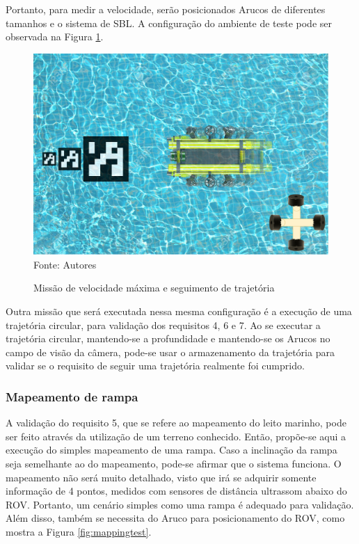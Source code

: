 Portanto, para medir a velocidade, serão posicionados Arucos de diferentes tamanhos e o sistema de SBL. A configuração do ambiente de teste pode ser observada na Figura \ref{fig:speedtest}. 

\begin{figure}[h]
	\centering
	\caption{Missão de velocidade máxima e seguimento de trajetória}
	\label{fig:speedtest}
	\includegraphics[width=0.8\linewidth]{images/speed_test}\\
	\footnotesize Fonte: Autores
\end{figure}

Outra missão que será executada nessa mesma configuração é a execução de uma trajetória circular, para validação dos requisitos 4, 6 e 7. Ao se executar a trajetória circular, mantendo-se a profundidade e mantendo-se os Arucos no campo de visão da câmera, pode-se usar o armazenamento da trajetória para validar se o requisito de seguir uma trajetória realmente foi cumprido.

\subsubsection*{Mapeamento de rampa}

A validação do requisito 5, que se refere ao mapeamento do leito marinho, pode ser
feito através da utilização de um terreno conhecido. Então, propõe-se aqui a execução do simples mapeamento de uma rampa. Caso a inclinação da rampa seja semelhante ao do mapeamento, pode-se afirmar que o sistema funciona. O mapeamento não será muito detalhado, visto que irá se adquirir somente informação de 4 pontos, medidos com sensores de distância ultrassom abaixo do ROV. Portanto, um cenário simples como uma rampa é adequado para validação. Além disso, também se necessita do Aruco para posicionamento do ROV, como mostra a Figura \ref{fig:mappingtest}.

